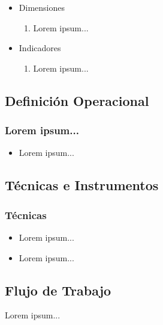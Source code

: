 \begin{itemize}
	\item Dimensiones
	\begin{enumerate}
		\item Lorem ipsum...
	\end{enumerate}
	
	\item Indicadores
	\begin{enumerate}
		\item Lorem ipsum...
	\end{enumerate}
\end{itemize}

\subsection{Definición Operacional}

\subsubsection{Lorem ipsum...}

\begin{itemize}
	\item Lorem ipsum...
\end{itemize}

\subsection{Técnicas e Instrumentos}

\subsubsection{Técnicas}

\begin{itemize}
	
	\item Lorem ipsum...
	\item Lorem ipsum...	
\end{itemize}

\subsection{Flujo de Trabajo}

Lorem ipsum...